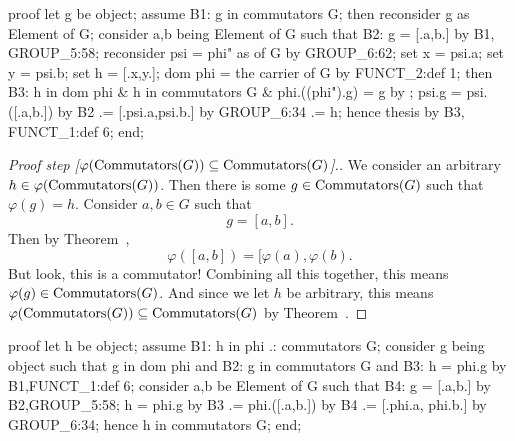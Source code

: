 \nwenddocs{}\endmoddef\nwstartdeflinemarkup{}\nwenddeflinemarkup
proof
  let g be object;
  assume B1: g in commutators G;
  then reconsider g as Element of G;
  consider a,b being Element of G such that
  B2: g = [.a,b.]
  by B1, GROUP_5:58;
  reconsider psi = phi" as  of G by GROUP_6:62;
  set x = psi.a;
  set y = psi.b;
  set h = [.x,y.];
  dom phi = the carrier of G by FUNCT_2:def 1;
  then B3: h in dom phi & h in commutators G & phi.((phi").g) = g by ;
  psi.g = psi.([.a,b.]) by B2
       .= [.psi.a,psi.b.] by GROUP_6:34
       .= h;
  hence thesis by B3, FUNCT_1:def 6;
end;
\nwendcode{}\nwdocspar

\begin{proof}[{Proof step [$\varphi(\operatorname{Commutators}(G))\subseteq\operatorname{Commutators}(G)$]}.]
We consider an arbitrary $h\in\varphi(\operatorname{Commutators}(G))$. Then there is
some $g\in\operatorname{Commutators}(G)$ such that $\varphi(g)=h$. Consider $a,b\in G$
such that
\begin{equation}
g=[a,b].
\end{equation}
Then by Theorem~,
\begin{equation}
\varphi([a,b])
= [\varphi(a),\varphi(b).
\end{equation}
But look, this is a commutator! Combining all this together, this means
$\varphi(g)\in\operatorname{Commutators}(G)$. And since we let $h$ be arbitrary, this
means $\varphi(\operatorname{Commutators}(G))\subseteq\operatorname{Commutators}(G)$ by Theorem~.
\end{proof}

\nwenddocs{}\endmoddef\nwstartdeflinemarkup{}\nwenddeflinemarkup
proof
  let h be object;
  assume B1: h in phi .: commutators G;
  consider g being object such that
      g in dom phi and
  B2: g in commutators G and
  B3: h = phi.g
  by B1,FUNCT_1:def 6;
  consider a,b be Element of G such that
  B4: g = [.a,b.]
  by B2,GROUP_5:58;
  h = phi.g by B3
   .= phi.([.a,b.]) by B4
   .= [.phi.a, phi.b.] by GROUP_6:34;
  hence h in commutators G;
end;
\nwendcode{}\nwdocspar

